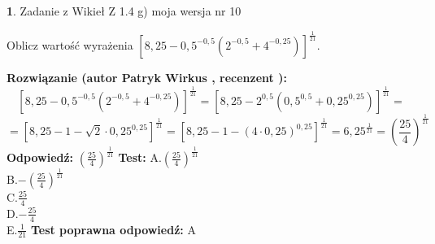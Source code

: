 \documentclass[12pt, a4paper]{article}
\theoremstyle{definition} %
\newtheorem{zad}{}
\newcommand{\zadStart}[1]{\begin{zad}#1\newline}
\newcommand{\zadStop}{\end{zad}}
\newcommand{\rozwStart}[2]{\noindent \textbf{Rozwiązanie (autor #1 , recenzent #2): }\newline}
\newcommand{\rozwStop}{\newline}
\newcommand{\odpStart}{\noindent \textbf{Odpowiedź:}\newline}
\newcommand{\odpStop}{\newline}
\newcommand{\testStart}{\noindent \textbf{Test:}\newline}
\newcommand{\testStop}{\newline}
\newcommand{\kluczStart}{\noindent \textbf{Test poprawna odpowiedź:}\newline}
\newcommand{\kluczStop}{\newline}
\begin{document}
\zadStart{Zadanie z Wikieł Z 1.4 g) moja wersja nr 10}

Oblicz wartość wyrażenia $[8,25-0,5^{-0,5}(2^{-0,5}+4^{-0,25})]^{\frac{1}{21}}$.
\zadStop
\rozwStart{Patryk Wirkus}{}
$$[8,25-0,5^{-0,5}(2^{-0,5}+4^{-0,25})]^{\frac{1}{21}} = [8,25-2^{0,5}(0,5^{0,5}+0,25^{0,25})]^{\frac{1}{21}} =$$
$$=[8,25 - 1 - \sqrt{2} \cdot 0,25^{0,25}]^{\frac{1}{21}} = [8,25 - 1 - (4\cdot 0,25)^{0,25}]^{\frac{1}{21}} = 6,25^{\frac{1}{21}} = (\frac{25}{4})^{\frac{1}{21}}$$
\rozwStop
\odpStart
$(\frac{25}{4})^{\frac{1}{21}}$
\odpStop
\testStart
A.$(\frac{25}{4})^{\frac{1}{21}}$\\ B.$-(\frac{25}{4})^{\frac{1}{21}}$\\ C.$\frac{25}{4}$\\ D.$-\frac{25}{4}$\\ E.$\frac{1}{21}$
\testStop
\kluczStart
A
\kluczStop
\end{document}
